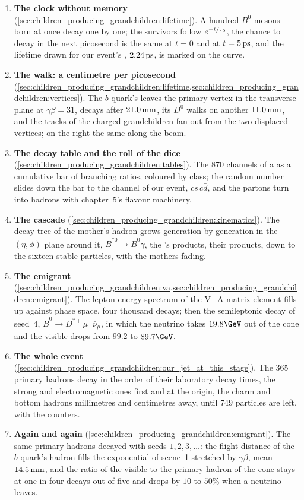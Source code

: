 \begin{enumerate}
  \item \textbf{The clock without memory} (\cref{sec:children_producing_grandchildren:lifetime}).
    A hundred $B^0$ mesons born at once decay one by one; the survivors
    follow $e^{-t/\tau_0}$, the chance to decay in the next picosecond is
    the same at $t=0$ and at $t=5\,\mathrm{ps}$, and the lifetime drawn for our
    event's \Bbar, $2.24\,\mathrm{ps}$, is marked on the curve.
  \item \textbf{The walk: a centimetre per picosecond} (\cref{sec:children_producing_grandchildren:lifetime,sec:children_producing_grandchildren:vertices}).
    The $b$ quark's \Bbar leaves the primary vertex in the transverse plane
    at $\gamma\beta=31$, decays after $21.0\,\mathrm{mm}$, its $D^0$ walks on another
    $11.0\,\mathrm{mm}$, and the tracks of the charged grandchildren fan out from the
    two displaced vertices; on the right the same along the beam.
  \item \textbf{The decay table and the roll of the dice} (\cref{sec:children_producing_grandchildren:tables}).
    The 870 channels of a \Bbar as a cumulative bar of branching ratios,
    coloured by class; the random number slides down the bar to the
    channel of our event, $\bar c s\,c\bar d$, and the partons turn into
    hadrons with chapter~5's flavour machinery.
  \item \textbf{The cascade} (\cref{sec:children_producing_grandchildren:kinematics}).
    The decay tree of the mother's hadron grows generation by generation in
    the $(\eta,\phi)$ plane around it, $\bar B^{*0}\to\bar B^0\gamma$, the
    \Bbar's products, their products, down to the sixteen stable particles,
    with the mothers fading.
  \item \textbf{The emigrant} (\cref{sec:children_producing_grandchildren:va,sec:children_producing_grandchildren:emigrant}).
    The lepton energy spectrum of the V$-$A matrix element fills up
    against phase space, four thousand decays; then the semileptonic decay
    of seed~4, $\bar B^0\to D^{*+}\mu^-\bar\nu_\mu$, in which the neutrino
    takes $19.8\GeV$ out of the cone and the visible \pt drops from $99.2$
    to $89.7\GeV$.
  \item \textbf{The whole event} (\cref{sec:children_producing_grandchildren:our_jet_at_this_stage}).
    The 365 primary hadrons decay in the order of their laboratory decay
    times, the strong and electromagnetic ones first and at the origin, the
    charm and bottom hadrons millimetres and centimetres away, until 749
    particles are left, with the counters.
  \item \textbf{Again and again} (\cref{sec:children_producing_grandchildren:emigrant}).
    The same primary hadrons decayed with seeds $1,2,3,\ldots$: the flight
    distance of the $b$ quark's hadron fills the exponential of scene~1
    stretched by $\gamma\beta$, mean $14.5\,\mathrm{mm}$, and the ratio of the visible
    to the primary-hadron \pt of the cone stays at one in four decays out of
    five and drops by $10$ to $50\%$ when a neutrino leaves.
\end{enumerate}
